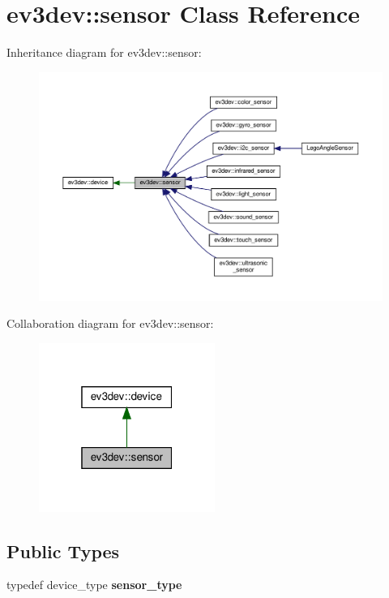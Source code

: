 \hypertarget{classev3dev_1_1sensor}{}\section{ev3dev\+:\+:sensor Class Reference}
\label{classev3dev_1_1sensor}


Inheritance diagram for ev3dev\+:\+:sensor\+:
\nopagebreak
\begin{figure}[H]
\begin{center}
\leavevmode
\includegraphics[width=350pt]{classev3dev_1_1sensor__inherit__graph}
\end{center}
\end{figure}


Collaboration diagram for ev3dev\+:\+:sensor\+:
\nopagebreak
\begin{figure}[H]
\begin{center}
\leavevmode
\includegraphics[width=163pt]{classev3dev_1_1sensor__coll__graph}
\end{center}
\end{figure}
\subsection*{Public Types}
\begin{DoxyCompactItemize}
\item 
\mbox{\label{classev3dev_1_1sensor_a3c8c9d2fd4d2ebaea90ec9d9fd40b813}} 
typedef device\+\_\+type {\bfseries sensor\+\_\+type}
\end{DoxyCompactItemize}

